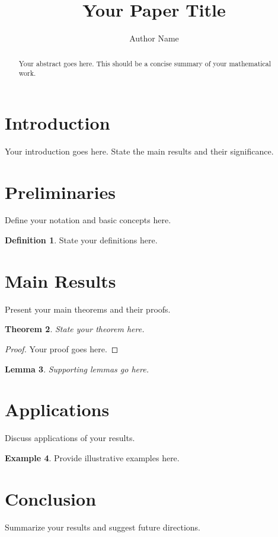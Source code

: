 \documentclass{amsart}
\newtheorem{theorem}{Theorem}[section]
\newtheorem{lemma}[theorem]{Lemma}
\theoremstyle{definition}
\newtheorem{definition}[theorem]{Definition}
\newtheorem{example}[theorem]{Example}
\theoremstyle{remark}
\begin{document}
\title{Your Paper Title}
\author{Author Name}
\address{Department Name\\
         Institution Name\\
         City, State, Country}

\begin{abstract}
Your abstract goes here. This should be a concise summary of your mathematical work.
\end{abstract}

\maketitle

\section{Introduction}
Your introduction goes here. State the main results and their significance.

\section{Preliminaries}
Define your notation and basic concepts here.

\begin{definition}
State your definitions here.
\end{definition}

\section{Main Results}
Present your main theorems and their proofs.

\begin{theorem}
State your theorem here.
\end{theorem}

\begin{proof}
Your proof goes here.
\end{proof}

\begin{lemma}
Supporting lemmas go here.
\end{lemma}

\section{Applications}
Discuss applications of your results.

\begin{example}
Provide illustrative examples here.
\end{example}

\section{Conclusion}
Summarize your results and suggest future directions.



\end{document}
